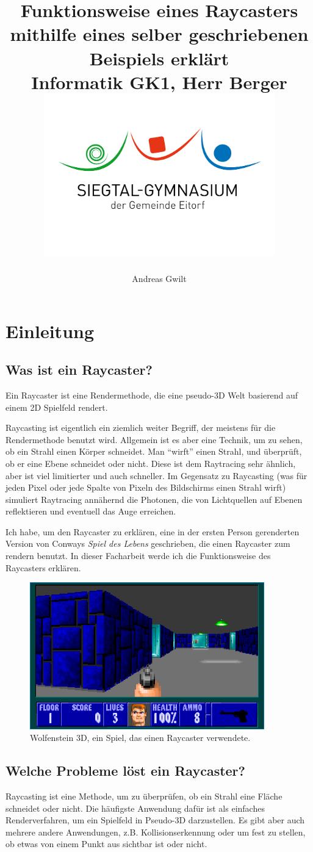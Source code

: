 \documentclass[a4paper,12pt]{report}
\title{{Funktionsweise eines Raycasters mithilfe eines selber geschriebenen Beispiels erkl\"art \vspace{1cm}} \\
        {\large Informatik GK1, Herr Berger} \\
        {\includegraphics[width=10cm]{sge.jpg}}}
\author{Andreas Gwilt}
\newcommand{\mychapter}[2]{
    \setcounter{chapter}{#1}
    \setcounter{section}{0}
    \chapter*{#2}
    \addcontentsline{toc}{chapter}{#2}
}
\begin{document}
\maketitle
\setcounter{page}{2}
\tableofcontents

\mychapter{1}{Einleitung}

\section{Was ist ein Raycaster?}
Ein Raycaster ist eine Rendermethode, die eine pseudo-3D Welt basierend auf einem 2D Spielfeld rendert\cite{scratch}.

Raycasting ist eigentlich ein ziemlich weiter Begriff, der meistens für die Rendermethode benutzt wird. Allgemein ist es aber eine Technik, um zu sehen, ob ein Strahl einen Körper schneidet. Man ``wirft'' einen Strahl, und überprüft, ob er eine Ebene schneidet oder nicht. Diese ist dem Raytracing sehr ähnlich, aber ist viel limitierter und auch schneller. Im Gegensatz zu Raycasting (was für jeden Pixel oder jede Spalte von Pixeln des Bildschirms einen Strahl wirft) simuliert Raytracing annähernd die Photonen, die von Lichtquellen auf Ebenen reflektieren und eventuell das Auge erreichen.

Ich habe, um den Raycaster zu erklären, eine in der ersten Person gerenderten Version von Conways \textit{Spiel des Lebens}\cite{life} geschrieben, die einen Raycaster zum rendern benutzt. In dieser Facharbeit werde ich die Funktionsweise des Raycasters erklären.

\begin{figure}[htbp] 
        \centering
        \includegraphics[width=4in]{wolf3d.png} 
        \caption{Wolfenstein 3D, ein Spiel, das einen Raycaster verwendete.}
        \label{fig:wolf3d}
\end{figure}

\section{Welche Probleme löst ein Raycaster?}
Raycasting ist eine Methode, um zu überprüfen, ob ein Strahl eine Fläche schneidet oder nicht. Die häufigste Anwendung dafür ist als einfaches Renderverfahren, um ein Spielfeld in Pseudo-3D darzustellen. Es gibt aber auch mehrere andere Anwendungen, z.B. Kollisionserkennung oder um fest zu stellen, ob etwas von einem Punkt aus sichtbar ist oder nicht.
\end{document}
